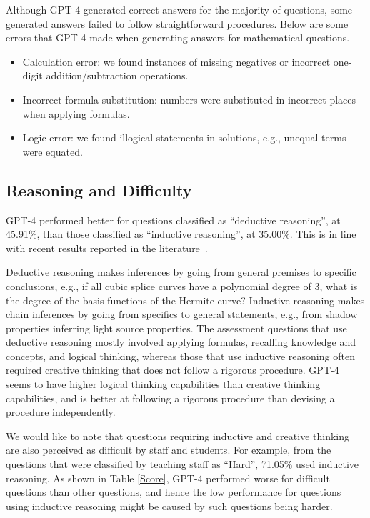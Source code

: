 \documentclass[sigconf,review]{acmart}
\begin{document}
Although GPT-4 generated correct answers for the majority of questions, some generated answers failed to follow straightforward procedures. Below are some errors that GPT-4 made when generating answers for mathematical questions.
\begin{itemize}
    \item Calculation error: we found instances of missing negatives or incorrect one-digit addition/subtraction operations.
    \item Incorrect formula substitution: numbers were substituted in incorrect places when applying formulas.
    \item Logic error: we found illogical statements in solutions, e.g., unequal terms were equated.
\end{itemize}

\subsection{Reasoning and Difficulty}

GPT-4 performed better for questions classified as ``deductive reasoning'', at 45.91\%, than those classified as ``inductive reasoning'', at 35.00\%. This is in line with recent results reported in the literature~\cite{Espejel2023,liu2023}.

Deductive reasoning makes inferences by going from general premises to specific conclusions, e.g., if all cubic splice curves have a polynomial degree of 3, what is the degree of the basis functions of the Hermite curve? Inductive reasoning makes chain inferences by going from specifics to general statements, e.g., from shadow properties inferring light source properties. The assessment questions that use deductive reasoning mostly involved applying formulas, recalling knowledge and concepts, and logical thinking, whereas those that use inductive reasoning often required creative thinking that does not follow a rigorous procedure.
GPT-4 seems to have higher logical thinking capabilities than creative thinking capabilities, and is better at following a rigorous procedure than devising a procedure independently.

We would like to note that questions requiring inductive and creative thinking are also perceived as difficult by staff and students. For example, from the questions that were classified by teaching staff as ``Hard'', 71.05\% used inductive reasoning. As shown in Table \ref{Score}, GPT-4 performed worse for difficult questions than other questions, and hence the low performance for questions using inductive reasoning might be caused by such questions being harder.
\end{document}
